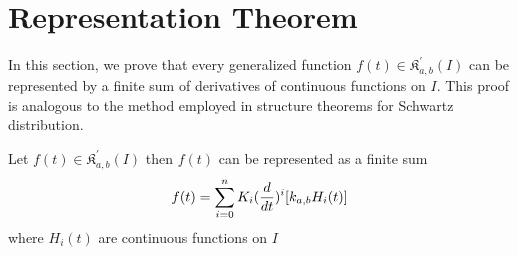 \section{Representation Theorem}
In this section, we prove that every generalized function $f(t)\in \mathfrak{K}_{a,b}^{'}(I)$ can be represented by a finite sum of derivatives of continuous functions on $ I $. This proof is analogous to the method employed in structure theorems for Schwartz distribution\cite{R72,R73,R88}.
\begin{theorem}
Let $f(t)\in \mathfrak{K}_{a,b}^{'}(I)$ then $f(t)$ can be represented as a finite sum\\
\begin{equation}
f(t)=\sum_{i=0}^{n}K_{i}(\dfrac{d}{dt})^{i}\large[k_{a,b}H_{i}(t)]
\end{equation}
where $ H_{i}(t) $ are continuous functions on $ I $
\end{theorem}

